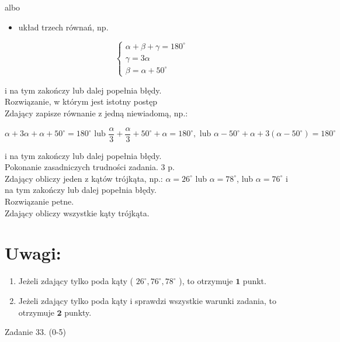 \documentclass[10pt]{article}
\begin{document}
albo

\begin{itemize}
  \item układ trzech równań, np.
\end{itemize}

$$
\left\{\begin{array}{l}
\alpha+\beta+\gamma=180^{\circ} \\
\gamma=3 \alpha \\
\beta=\alpha+50^{\circ}
\end{array}\right.
$$

i na tym zakończy lub dalej popełnia błędy.\\
Rozwiązanie, w którym jest istotny postęp\\
Zdający zapisze równanie z jedną niewiadomą, np.:

$$
\alpha+3 \alpha+\alpha+50^{\circ}=180^{\circ} \text { lub } \frac{\alpha}{3}+\frac{\alpha}{3}+50^{\circ}+\alpha=180^{\circ}, \text { lub } \alpha-50^{\circ}+\alpha+3\left(\alpha-50^{\circ}\right)=180^{\circ}
$$

i na tym zakończy lub dalej popełnia błędy.\\
Pokonanie zasadniczych trudności zadania. 3 p.\\
Zdający obliczy jeden z kątów trójkąta, np.: $\alpha=26^{\circ}$ lub $\alpha=78^{\circ}$, lub $\alpha=76^{\circ}$ i na tym zakończy lub dalej popełnia błędy.\\
Rozwiązanie petne.\\
Zdający obliczy wszystkie kąty trójkąta.

\section*{Uwagi:}
\begin{enumerate}
  \item Jeżeli zdający tylko poda kąty ( $26^{\circ}, 76^{\circ}, 78^{\circ}$ ), to otrzymuje $\mathbf{1}$ punkt.
  \item Jeżeli zdający tylko poda kąty i sprawdzi wszystkie warunki zadania, to otrzymuje $\mathbf{2}$ punkty.
\end{enumerate}

Zadanie 33. (0-5)
\end{document}
